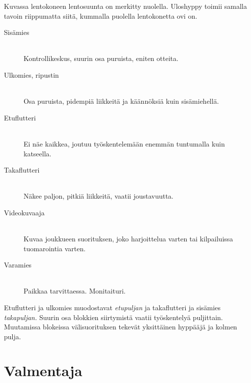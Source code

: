 Kuvassa lentokoneen lentosuunta on merkitty nuolella. Uloshyppy toimii samalla tavoin riippumatta siitä, kummalla puolella lentokonetta ovi on.  

\begin{description}
\item[Sisämies ] \hfill \\ 
Kontrollikeskus, suurin osa puruista, eniten otteita. \hfill \\ 
\end{description}
\begin{description}
\item[Ulkomies, ripustin ] \hfill \\ 
Osa puruista, pidempiä liikkeitä ja käännöksiä kuin sisämiehellä. \hfill \\ 
\end{description}
\begin{description}
\item[Etuflutteri ] \hfill \\ 
Ei näe kaikkea, joutuu työskentelemään enemmän tuntumalla kuin katseella. \hfill \\ 
\end{description}
\begin{description}
\item[Takaflutteri ] \hfill \\ 
Näkee paljon, pitkiä liikkeitä, vaatii joustavuutta. \hfill \\ 
\end{description}
\begin{description}
\item[Videokuvaaja ] \hfill \\ 
Kuvaa joukkueen suorituksen, joko harjoittelua varten tai kilpailuissa tuomarointia varten. \hfill \\ 
\end{description}
\begin{description}
\item[Varamies ] \hfill \\ 
Paikkaa tarvittaessa. Monitaituri. \hfill \\ 
\end{description}

Etuflutteri ja ulkomies muodostavat \textit{etupuljan} ja takaflutteri ja sisämies \textit{takapuljan.} Suurin osa blokkien siirtymistä vaatii työskentelyä puljittain. Muutamissa blokeissa välisuorituksen tekevät yksittäinen hyppääjä ja kolmen pulja. 

\section{ Valmentaja }
\label{4-way-joukkuehyppaaminen-valmentaja}


